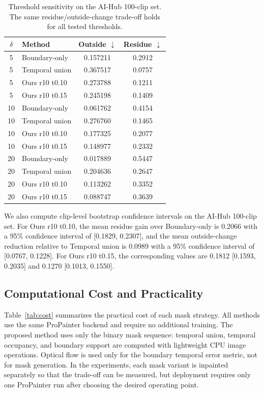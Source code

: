 \documentclass[nouppercase]{kaia}
\begin{document}
\begin{table}[h]
\begin{center}
\begin{tabular}{|c|l|c|c|}
\hline
$\delta$ & Method & Outside $\downarrow$ & Residue $\downarrow$ \\
\hline\hline
5 & Boundary-only & 0.157211 & 0.2912 \\
5 & Temporal union & 0.367517 & 0.0757 \\
5 & Ours r10 t0.10 & 0.273788 & 0.1211 \\
5 & Ours r10 t0.15 & 0.245198 & 0.1409 \\
\hline
10 & Boundary-only & 0.061762 & 0.4154 \\
10 & Temporal union & 0.276760 & 0.1465 \\
10 & Ours r10 t0.10 & 0.177325 & 0.2077 \\
10 & Ours r10 t0.15 & 0.148977 & 0.2332 \\
\hline
20 & Boundary-only & 0.017889 & 0.5447 \\
20 & Temporal union & 0.204636 & 0.2647 \\
20 & Ours r10 t0.10 & 0.113262 & 0.3352 \\
20 & Ours r10 t0.15 & 0.088747 & 0.3639 \\
\hline
\end{tabular}
\end{center}
\caption{Threshold sensitivity on the AI-Hub 100-clip set. The same residue/outside-change trade-off holds for all tested thresholds.}
\label{tab:threshold}
\end{table}

We also compute clip-level bootstrap confidence intervals on the AI-Hub 100-clip set. For Ours r10 t0.10, the mean residue gain over Boundary-only is 0.2066 with a 95\% confidence interval of [0.1829, 0.2307], and the mean outside-change reduction relative to Temporal union is 0.0989 with a 95\% confidence interval of [0.0767, 0.1228]. For Ours r10 t0.15, the corresponding values are 0.1812 [0.1593, 0.2035] and 0.1270 [0.1013, 0.1550].

\subsection{Computational Cost and Practicality}
Table~\ref{tab:cost} summarizes the practical cost of each mask strategy. All methods use the same ProPainter backend and require no additional training. The proposed method uses only the binary mask sequence: temporal union, temporal occupancy, and boundary support are computed with lightweight CPU image operations. Optical flow is used only for the boundary temporal error metric, not for mask generation. In the experiments, each mask variant is inpainted separately so that the trade-off can be measured, but deployment requires only one ProPainter run after choosing the desired operating point.
\end{document}
